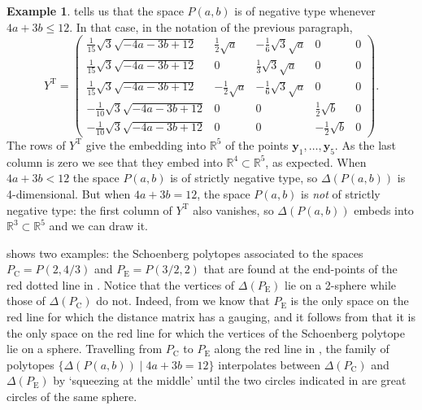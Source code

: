 \documentclass[a4paper, oneside, reqno]{amsart}
\theoremstyle{definition}
\newtheorem{example}[theorem]{Example}
\theoremstyle{remark}
\numberwithin{equation}{section}
\renewcommand{\vec}{\mathbf}
\newcommand{\transpose}{\mathrm{T}}
\newcommand{\R}{\mathbb{R}}
\begin{document}
\begin{example}
\label{eg:schoenberg_polytope}
 tells us that the space \(P(a, b)\) is of negative type whenever \(4a + 3b \le 12\). In that case, in the notation of the previous paragraph,
\[Y^\transpose = 
\begin{pmatrix}
    \frac{1}{15}  \sqrt{3} \sqrt{-4  a - 3  b + 12}
    & \frac{1}{2}  \sqrt{a}
    & -\frac{1}{6}  \sqrt{3} \sqrt{a}
    & 0 & 0 \\
    \frac{1}{15}  \sqrt{3} \sqrt{-4  a - 3  b + 12}
    & 0
    & \frac{1}{3}  \sqrt{3} \sqrt{a}
    & 0 & 0\\
    \frac{1}{15}  \sqrt{3} \sqrt{-4  a - 3  b + 12}
    & -\frac{1}{2}  \sqrt{a}
    & -\frac{1}{6}  \sqrt{3} \sqrt{a}
    & 0 & 0\\
    -\frac{1}{10}  \sqrt{3} \sqrt{-4  a - 3  b + 12}
    & 0
    & 0
    & \frac{1}{2}  \sqrt{b} & 0\\
    -\frac{1}{10}  \sqrt{3} \sqrt{-4  a - 3  b + 12}
    & 0
    & 0
    & -\frac{1}{2}  \sqrt{b} & 0
\end{pmatrix}.
\]
The rows of \(Y^\transpose\) give the embedding into \(\R^5\) of the points \(\vec{y}_1,\ldots, \vec{y}_5\). As the last column is zero we see that they embed into \(\R^4 \subset \R^5\), as expected. When \(4a + 3b < 12\) the space \(P(a,b)\) is of strictly negative type, so \(\Delta(P(a,b))\) is 4-dimensional. But when \(4a + 3b = 12\), the space \(P(a,b)\) is \emph{not} of strictly negative type: the first column of \(Y^\transpose\) also vanishes, so \(\Delta(P(a,b))\) embeds into \(\R^3 \subset \R^5\) and we can draw it. 

 shows two examples: the Schoenberg polytopes associated to the spaces \(P_{\mathrm{C}} = P(2,4/3)\) and \(P_{\mathrm{E}} = P(3/2,2)\) that are found at the end-points of the red dotted line in . Notice that the vertices of \(\Delta(P_{\mathrm{E}})\) lie on a 2-sphere while those of \(\Delta(P_{\mathrm{C}})\) do not. Indeed, from  we know that \(P_{\mathrm{E}}\) is the only space on the red line for which the distance matrix has a gauging, and it follows from  that it is the only space on the red line for which the vertices of the Schoenberg polytope lie on a sphere. Travelling from \(P_{\mathrm{C}}\) to \(P_{\mathrm{E}}\) along the red line in , the family of polytopes \(\{\Delta(P(a,b)) \mid 4a+3b=12\}\) interpolates between \(\Delta(P_{\mathrm{C}})\) and \(\Delta(P_{\mathrm{E}})\) by `squeezing at the middle' until the two circles indicated in  are great circles of the same sphere.
\end{example}
\end{document}
